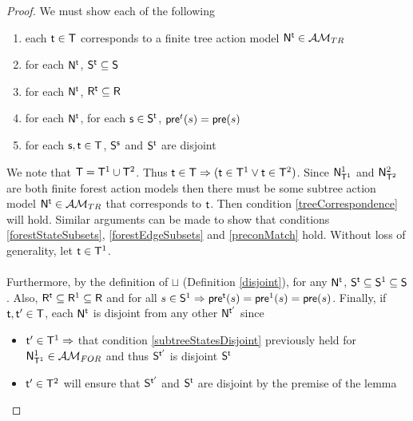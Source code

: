 \begin{proof}
We must show each of the following
\begin{enumerate}
	\item each $\evt \in \evT$ corresponds to a finite tree action model $\evM^\evt \in \treeClass$ \label{treeCorrespondence}
	\item for each $\evM^\evt$, $\evS^\evt \subseteq \evS$ \label{forestStateSubsets}
	\item for each $\evM^\evt$, $\evR^\evt \subseteq \evR$ \label{forestEdgeSubsets}
	\item for each $\evM^\evt$, for each $\evs \in \evS^\evt$, $\evpr^t(s) = \evpr(s)$ \label{preconMatch}
	\item for each $\evs, \evt \in \evT$, $\evS^\evs$ and $\evS^\evt$ are disjoint \label{subtreeStatesDisjoint}
\end{enumerate}

We note that $\evT = \evT^1 \cup \evT^2$.
Thus $\evt \in \evT \Rightarrow (\evt \in \evT^1 \lor \evt \in \evT^2)$.
Since $\evM^1_{\evT^1}$ and $\evM^2_{\evT^2}$ are both finite forest action models then there must be some
subtree action model $\evM^\evt \in \treeClass$ that corresponds to $\evt$.
Then condition \ref{treeCorrespondence} will hold.
Similar arguments can be made to show that conditions \ref{forestStateSubsets}, \ref{forestEdgeSubsets}
and \ref{preconMatch} hold.
Without loss of generality, let $\evt \in \evT^1$.\\
\\
Furthermore, by the definition of $\sqcup$ (Definition \ref{disjoint}), for any $\evM^\evt$, $\evS^\evt \subseteq \evS^1 \subseteq \evS$.
Also, $\evR^\evt \subseteq \evR^1 \subseteq \evR$ and for all $s \in \evS^1 \Rightarrow \evpr^\evt(s) = \evpr^1(s) =
\evpr(s)$.
Finally, if $\evt, \evt' \in \evT$, each $\evM^\evt$ is disjoint from any other $\evM^{\evt'}$ since
\begin{itemize}
	\item $\evt' \in \evT^1 \Rightarrow$ that condition \ref{subtreeStatesDisjoint} previously held for
	$\evM^1_{\evT^1} \in \forestClass$ and thus $\evS^{\evt'}$ is disjoint $\evS^\evt$
	\item $\evt' \in \evT^2$ will ensure that $\evS^{\evt'}$ and $\evS^\evt$ are disjoint by the premise of
	the lemma
\end{itemize}
\end{proof}

